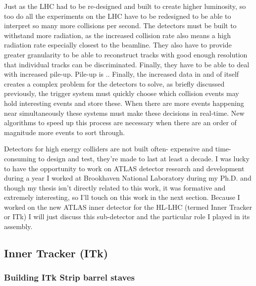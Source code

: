 Just as the LHC had to be re-designed and built to create higher luminosity, so too do all the experiments on the LHC have to be redesigned to be able to interpret so many more collisions per second. The detectors must be built to withstand more radiation, as the increased collision rate also means a high radiation rate especially closest to the beamline. They also have to provide greater granularity to be able to reconstruct tracks with good enough resolution that individual tracks can be discriminated. Finally, they have to be able to deal with increased pile-up. Pile-up is .. Finally, the increased data in and of itself creates a complex problem for the detectors to solve, as briefly discussed previously, the trigger system must quickly choose which collision events may hold interesting events and store these. When there are more events happening near simultaneously these systems must make these decisions in real-time. New algorithms to speed up this process are necessary when there are an order of magnitude more events to sort through.

Detectors for high energy colliders are not built often- expensive and time-consuming to design and test, they're made to last at least a decade. I was lucky to have the opportunity to work on ATLAS detector research and development during a year I worked at Brookhaven National Laboratory during my Ph.D. and though my thesis isn't directly related to this work, it was formative and extremely interesting, so I'll touch on this work in the next section. Because I worked on the new ATLAS inner detector for the HL-LHC (termed Inner Tracker or ITk) I will just discuss this sub-detector and the particular role I played in its assembly.

\subsection{Inner Tracker (ITk)}
\subsubsection{Building ITk Strip barrel staves}

